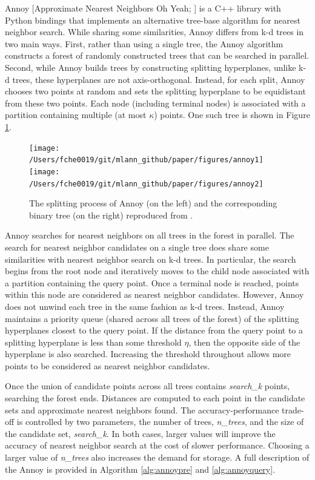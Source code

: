 \documentclass[11pt,a4paper,]{article}
\begin{document}
Annoy {[}Approximate Nearest Neighbors Oh Yeah; \textcite{Bernhardsson2016-tf}{]} is a C++ library with Python bindings that implements an alternative tree-base algorithm for nearest neighbor search. While sharing some similarities, Annoy differs from k-d trees in two main ways. First, rather than using a single tree, the Annoy algorithm constructs a forest of randomly constructed trees that can be searched in parallel. Second, while Annoy builds trees by constructing splitting hyperplanes, unlike k-d trees, these hyperplanes are not axis-orthogonal. Instead, for each split, Annoy chooses two points at random and sets the splitting hyperplane to be equidistant from these two points. Each node (including terminal nodes) is associated with a partition containing multiple (at most \(\kappa\)) points. One such tree is shown in Figure \ref{fig:annoy}.



\begin{figure}

{\centering \texttt{[image: /Users/fche0019/git/mlann\_github/paper/figures/annoy1]} \texttt{[image: /Users/fche0019/git/mlann\_github/paper/figures/annoy2]} 

}

\caption{The splitting process of Annoy (on the left) and the corresponding binary tree (on the right) reproduced from \textcite{Bernhardsson2015-slides}.}\label{fig:annoy}
\end{figure}

Annoy searches for nearest neighbors on all trees in the forest in parallel. The search for nearest neighbor candidates on a single tree does share some similarities with nearest neighbor search on k-d trees. In particular, the search begins from the root node and iteratively moves to the child node associated with a partition containing the query point. Once a terminal node is reached, points within this node are considered as nearest neighbor candidates. However, Annoy does not unwind each tree in the same fashion as k-d trees. Instead, Annoy maintains a priority queue (shared across all trees of the forest) of the splitting hyperplanes closest to the query point. If the distance from the query point to a splitting hyperplane is less than some threshold \(\eta\), then the opposite side of the hyperplane is also searched. Increasing the threshold throughout allows more points to be considered as nearest neighbor candidates.

Once the union of candidate points across all trees contains \textit{search\_k} points, searching the forest ends. Distances are computed to each point in the candidate sets and approximate nearest neighbors found. The accuracy-performance trade-off is controlled by two parameters, the number of trees, \textit{n\_trees}, and the size of the candidate set, \textit{search\_k}. In both cases, larger values will improve the accuracy of nearest neighbor search at the cost of slower performance. Choosing a larger value of \textit{n\_trees} also increases the demand for storage. A full description of the Annoy is provided in Algorithm \ref{alg:annoypre} and \ref{alg:annoyquery}.
\end{document}
